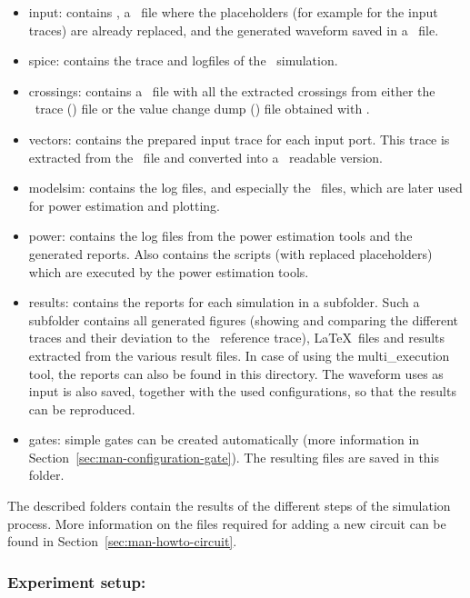 \begin{itemize}
\item input: contains \mainnewexp, a \spice\ file where the placeholders (for 
example for the input traces) are already replaced, and the generated waveform 
saved in a \jsonfile\ file. 
\item spice: contains the trace and logfiles of the \spice\ simulation. 
\item crossings: contains a \jsonfile\ file with all the extracted 
crossings from either the \hspice\ trace (\trfile) file or the value change 
dump (\vcdfile) file obtained with \spectre.
\item vectors: contains the prepared input trace for each input port. This 
trace is extracted from the \crossingsjson\ file and converted into a \vhdl\ 
readable version. 
\item modelsim: contains the log files, and especially the \vcdfile\ files, 
which are later used for power estimation and plotting.
\item power: contains the log files from the power estimation tools and the
generated reports. Also contains the scripts (with replaced placeholders) which 
are executed by the power estimation tools.
\item results: contains the reports for each simulation in a subfolder. Such a
subfolder contains all generated figures (showing and comparing the different 
traces and their deviation to the \spice\ reference trace), \LaTeX\ files and 
results extracted from the various result files. In case of using the 
multi\_execution tool, the reports can also be found in this directory. The 
waveform uses as input is also saved, together with the used configurations, so 
that the results can be reproduced.
\item gates: simple gates can be created automatically (more information in 
Section~\ref{sec:man-configuration-gate}). The resulting \file{*.vhd} files 
are saved in this folder.
\end{itemize}

The described folders contain the results of the different steps of the
simulation process. More information on the files required for adding a
new circuit can be found in Section~\ref{sec:man-howto-circuit}.

\subsubsection{Experiment setup:}
\label{sec:man-stuc-experiment-setup}

